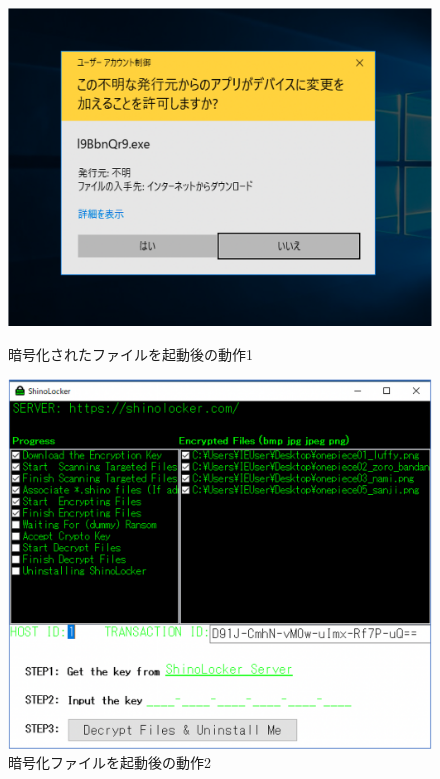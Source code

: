 \documentclass[dvipdfmx,autodetect-engine]{jsarticle}
\begin{document}
\begin{figure}[H]
  \centering
  \begin{minipage}[b]{0.45\linewidth}
  \begin{center}
    \includegraphics[keepaspectratio,scale=0.5]{pic4.png}
    \end{center}
    \caption{暗号化されたファイルを起動後の動作1}
  \end{minipage}
  \begin{minipage}[b]{0.45\linewidth}
  \begin{center}
    \includegraphics[keepaspectratio,scale=0.45]{pic5.png}
    \end{center}
    \caption{暗号化ファイルを起動後の動作2}
  \end{minipage}
\end{figure}
\end{document}
